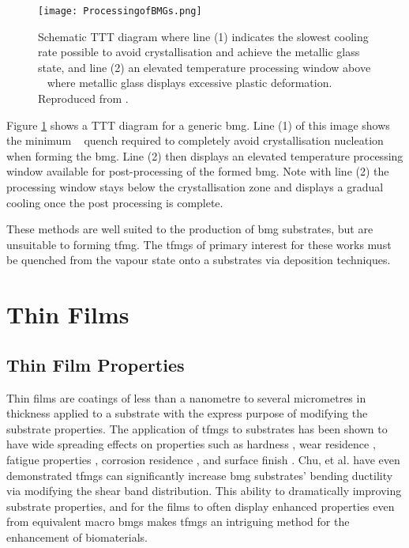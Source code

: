\documentclass[a4paper,12pt,oneside]{report}%
\begin{document}
\begin{figure}[htbp]
	\centering
	\texttt{[image: ProcessingofBMGs.png]}
	\caption[Schematic TTT diagram where line (1) indicates the slowest cooling rate possible to avoid crystallisation and achieve the metallic glass state, and line (2) an elevated temperature processing window above \Tg~ where metallic glass displays excessive plastic deformation.]{Schematic TTT diagram where line (1) indicates the slowest cooling rate possible to avoid crystallisation and achieve the metallic glass state, and line (2) an elevated temperature processing window above \Tg~ where metallic glass displays excessive plastic deformation. Reproduced from \cite{Schroers2010}.}
	\label{fig:BMGTTT}
\end{figure}

Figure \ref{fig:BMGTTT} shows a TTT diagram for a generic \gls{bmg}. Line (1) of this image shows the minimum \Rc~ quench required to completely avoid crystallisation nucleation when forming the \gls{bmg}. Line (2) then displays an elevated temperature processing window available for post-processing of the formed \gls{bmg}. Note with line (2) the processing window stays below the crystallisation zone and displays a gradual cooling once the post processing is complete.

These methods are well suited to the production of \gls{bmg} substrates, but are unsuitable to forming \gls{tfmg}. The \glspl{tfmg} of primary interest for these works must be quenched from the vapour state onto a substrates via deposition techniques.

\section{Thin Films}
\subsection{Thin Film Properties}
Thin films are coatings of less than a nanometre to several micrometres in thickness applied to a substrate with the express purpose of modifying the substrate properties. The application of \glspl{tfmg} to substrates has been shown to have wide spreading effects on properties such as hardness \cite{Chu2012},  wear residence \cite{Liu2009, Prakash2005}, fatigue properties \cite{Chiang2006, Chu2011}, corrosion residence \cite{Chu2009}, and surface finish \cite{Liu2009, Chiang2006, Chu2011, Tsai2012}. Chu, et al. \cite{Chu2012} have even demonstrated \glspl{tfmg} can significantly increase \gls{bmg} substrates' bending ductility via modifying the shear band distribution. This ability to dramatically improving substrate properties, and for the films to often display enhanced properties even from equivalent macro \glspl{bmg} makes \glspl{tfmg} an intriguing method for the enhancement of biomaterials.
\end{document}
